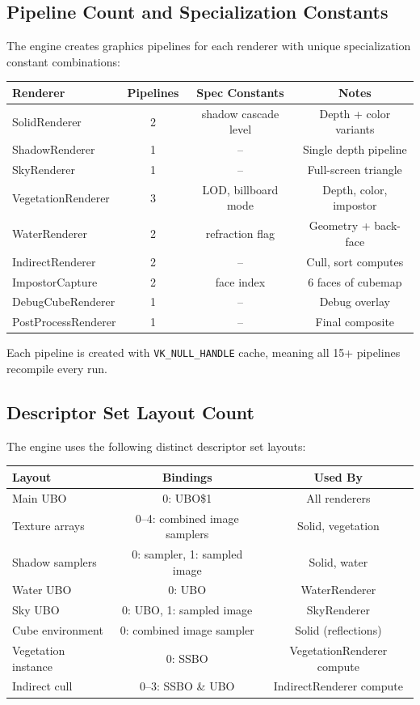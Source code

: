 \documentclass[a4paper,10pt]{article}
\begin{document}
\subsection{Pipeline Count and Specialization Constants}

The engine creates graphics pipelines for each renderer with unique
specialization constant combinations:

\begin{center}
\begin{tabular}{lccc}
\toprule
\textbf{Renderer} & \textbf{Pipelines} & \textbf{Spec Constants} & \textbf{Notes} \\
\midrule
SolidRenderer & 2 & shadow cascade level & Depth + color variants \\
ShadowRenderer & 1 & -- & Single depth pipeline \\
SkyRenderer & 1 & -- & Full-screen triangle \\
VegetationRenderer & 3 & LOD, billboard mode & Depth, color, impostor \\
WaterRenderer & 2 & refraction flag & Geometry + back-face \\
IndirectRenderer & 2 & -- & Cull, sort computes \\
ImpostorCapture & 2 & face index & 6 faces of cubemap \\
DebugCubeRenderer & 1 & -- & Debug overlay \\
PostProcessRenderer & 1 & -- & Final composite \\
\bottomrule
\end{tabular}
\end{center}

Each pipeline is created with \texttt{VK\_NULL\_HANDLE} cache, meaning all
15+ pipelines recompile every run.

\subsection{Descriptor Set Layout Count}

The engine uses the following distinct descriptor set layouts:

\begin{center}
\begin{tabular}{lcc}
\toprule
\textbf{Layout} & \textbf{Bindings} & \textbf{Used By} \\
\midrule
Main UBO & 0: UBO\$1 & All renderers \\
Texture arrays & 0--4: combined image samplers & Solid, vegetation \\
Shadow samplers & 0: sampler, 1: sampled image & Solid, water \\
Water UBO & 0: UBO & WaterRenderer \\
Sky UBO & 0: UBO, 1: sampled image & SkyRenderer \\
Cube environment & 0: combined image sampler & Solid (reflections) \\
Vegetation instance & 0: SSBO & VegetationRenderer compute \\
Indirect cull & 0--3: SSBO \& UBO & IndirectRenderer compute \\
\bottomrule
\end{tabular}
\end{center}
\end{document}
